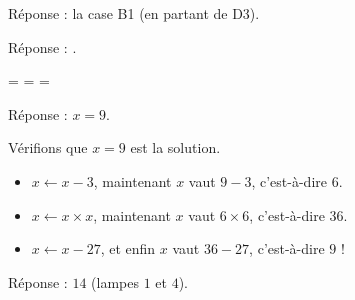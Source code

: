 \documentclass[class=report,crop=false, 12pt]{standalone}
\begin{document}






\begin{enigme}

Réponse : la case B1 (en partant de D3).

\end{enigme}




\begin{enigme}[Répéter]

Réponse : .

 =  \quad {} =  \quad {} = 


\end{enigme}



\begin{enigme}

Réponse : $x=9$.

Vérifions que $x=9$ est la solution.
\begin{itemize}
  \item $x \leftarrow x-3$, maintenant $x$ vaut $9-3$, c'est-à-dire $6$.
  \item $x \leftarrow x \times x$, maintenant $x$ vaut $6 \times 6$, c'est-à-dire $36$.
  \item $x \leftarrow x - 27$, et enfin $x$ vaut $36-27$, c'est-à-dire $9$ !
\end{itemize}
    
\end{enigme}





\begin{enigme}

Réponse : $14$ (lampes $1$ et $4$). 

\end{enigme}
\end{document}
